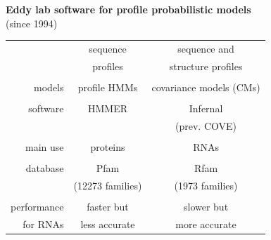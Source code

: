 \documentclass[landscape]{slides}
\begin{document}
\begin{slide}
\begin{center}
\textbf{Eddy lab software for profile probabilistic models} \\
(since 1994)
\end{center}
\medskip

\begin{center}
\small
\begin{tabular}{r|cc} 
             & sequence & sequence and \\
             & profiles & structure profiles \\ \hline
  \\
  models     & profile HMMs     & {\color{red} covariance models (CMs)} \\ 
  \\
  software   & {\sc HMMER}      & {\sc Infernal} \\ 
             &                  & (prev. COVE) \\
  \\
  main use   & proteins         & RNAs \\ 
  \\
  database   & {\sc Pfam}       & {\sc Rfam} \\
             & (12273 families) & (1973 families) \\
  \\
  performance& faster but    & slower but    \\
  for RNAs   & less accurate & more accurate \\
\end{tabular}


\end{center}
\end{slide}
\end{document}
